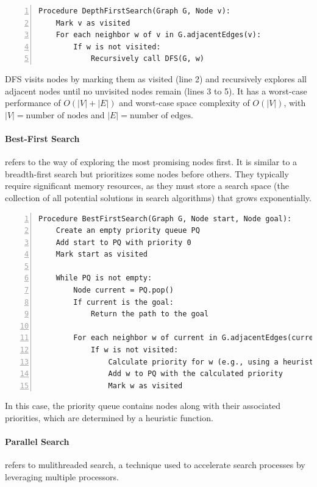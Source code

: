 \begin{lstlisting}[caption={Pseudocode of the Depth-First Search algorithm.}, captionpos=b, frame=single, numbers=left, xleftmargin=15pt]
Procedure DepthFirstSearch(Graph G, Node v):
    Mark v as visited
    For each neighbor w of v in G.adjacentEdges(v):
        If w is not visited:
            Recursively call DFS(G, w)
\end{lstlisting}

DFS visits nodes by marking them as visited (line 2) and recursively explores all adjacent nodes until no unvisited nodes remain (lines 3 to 5). It has a worst-case performance of $O(|V| + |E|)$ and worst-case space complexity of $O(|V|)$, with $|V| = \text{number of nodes}$ and $|E| = \text{number of edges}$.

\paragraph{Best-First Search} refers to the way of exploring the most promising nodes first. It is similar to a breadth-first search but prioritizes some nodes before others. They typically require significant memory resources, as they must store a search space (the collection of all potential solutions in search algorithms) that grows exponentially.

\begin{lstlisting}[caption={Pseudocode of the Best-First Search algorithm.}, captionpos=b, frame=single, numbers=left, xleftmargin=10pt, breaklines=true]
Procedure BestFirstSearch(Graph G, Node start, Node goal):
    Create an empty priority queue PQ
    Add start to PQ with priority 0
    Mark start as visited

    While PQ is not empty:
        Node current = PQ.pop()
        If current is the goal:
            Return the path to the goal

        For each neighbor w of current in G.adjacentEdges(current):
            If w is not visited:
                Calculate priority for w (e.g., using a heuristic)
                Add w to PQ with the calculated priority
                Mark w as visited
\end{lstlisting}

In this case, the priority queue contains nodes along with their associated priorities, which are determined by a heuristic function.

\paragraph{Parallel Search} refers to mulithreaded search, a technique used to accelerate search processes by leveraging multiple processors.

